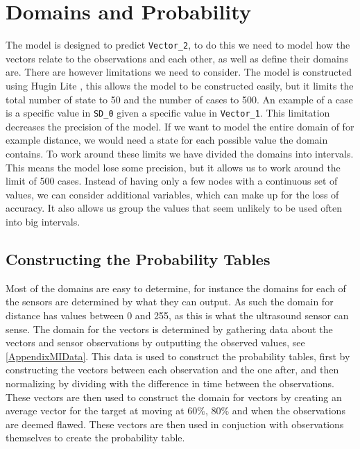 \section{Domains and Probability}\label{MID}

The model is designed to predict \texttt{Vector\_2}, to do this we need to
model how the vectors relate to the observations and each other, as well as
define their domains are. There are however limitations we need to consider. The
model is constructed using Hugin Lite \citep{Hugin}, this allows the model to
be constructed easily, but it limits the total number of state to 50 and
the number of cases to 500. An example of a case is a specific value in \texttt{SD\_0}
given a specific value in \texttt{Vector\_1}. This limitation decreases the
precision of the model. If we want to model the entire domain of for example
distance, we would need a state for each possible value the domain
contains. To work around these limits we have divided
the domains into intervals. This means the model lose some precision, but it
allows us to work around the limit of 500 cases. Instead of having only a few
nodes with a continuous set of values, we can consider additional variables,
which can  make up for the loss of accuracy. It also allows us group the values
that seem unlikely to be used often into big intervals.

\subsection{Constructing the Probability Tables}

Most of the domains are easy to determine, for instance the domains for each of
the sensors are determined by what they can output. As such the domain for
distance has values between 0 and 255, as this is what the ultrasound sensor
can sense. The domain for the vectors is determined by gathering data about the
vectors and sensor observations by outputting the observed values, see
\autoref{AppendixMIData}. This data is used to construct the
probability tables, first by constructing the vectors between each
observation and the one after, and then normalizing by dividing with the
difference in time between the observations. These vectors are then used to
construct the domain for vectors by creating an average vector for the target
at moving at 60\%, 80\% and when the observations are deemed flawed. These
vectors are then used in conjuction with observations themselves to create the
probability table.\nl


